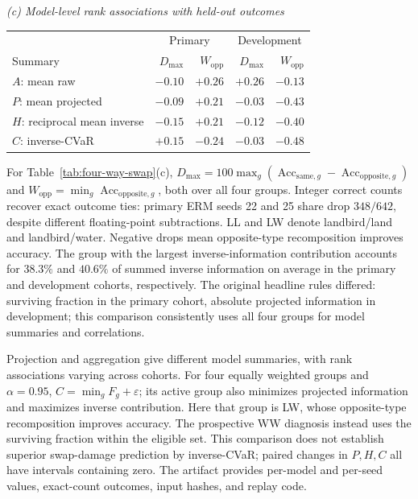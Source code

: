 \begin{table}[htbp]
\begin{tabular}{@{}>{\raggedright\arraybackslash}p{.34\linewidth}llrr@{}}
\end{tabular}
\par\smallskip
\textit{(c) Model-level rank associations with held-out outcomes}\par\smallskip
\begin{tabular}{@{}lrrrr@{}}
\toprule
& \multicolumn{2}{c}{Primary} & \multicolumn{2}{c}{Development}\\
Summary & $D_{\max}$ & $W_{\mathrm{opp}}$ & $D_{\max}$ & $W_{\mathrm{opp}}$\\
\midrule
$A$: mean raw & $-0.10$ & $+0.26$ & $+0.26$ & $-0.13$\\
$P$: mean projected & $-0.09$ & $+0.21$ & $-0.03$ & $-0.43$\\
$H$: reciprocal mean inverse & $-0.15$ & $+0.21$ & $-0.12$ & $-0.40$\\
$C$: inverse-CVaR & $+0.15$ & $-0.24$ & $-0.03$ & $-0.48$\\
\bottomrule
\end{tabular}
\end{table}

For Table~\ref{tab:four-way-swap}(c), $D_{\max}=100\max_g(\operatorname{Acc}_{\mathrm{same},g}-\operatorname{Acc}_{\mathrm{opposite},g})$ and $W_{\mathrm{opp}}=\min_g\operatorname{Acc}_{\mathrm{opposite},g}$, both over all four groups. Integer correct counts recover exact outcome ties: primary ERM seeds 22 and 25 share drop $348/642$, despite different floating-point subtractions. LL and LW denote landbird/land and landbird/water. Negative drops mean opposite-type recomposition improves accuracy. The group with the largest inverse-information contribution accounts for $38.3\%$ and $40.6\%$ of summed inverse information on average in the primary and development cohorts, respectively. The original headline rules differed: surviving fraction in the primary cohort, absolute projected information in development; this comparison consistently uses all four groups for model summaries and correlations.

Projection and aggregation give different model summaries, with rank associations varying across cohorts. For four equally weighted groups and $\alpha=0.95$, $C=\min_gF_g+\varepsilon$; its active group also minimizes projected information and maximizes inverse contribution. Here that group is LW, whose opposite-type recomposition improves accuracy. The prospective WW diagnosis instead uses the surviving fraction within the eligible set. This comparison does not establish superior swap-damage prediction by inverse-CVaR; paired changes in $P,H,C$ all have intervals containing zero. The artifact provides per-model and per-seed values, exact-count outcomes, input hashes, and replay code.
